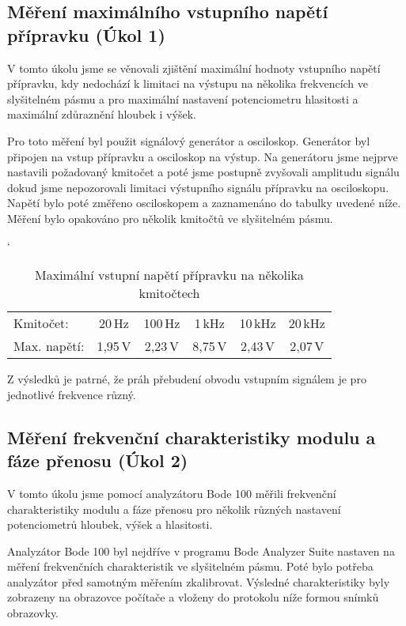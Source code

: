 \documentclass[a4paper, czech]{article}
\begin{document}
\subsection{Měření maximálního vstupního napětí přípravku (Úkol 1)}

V tomto úkolu jsme se věnovali zjištění maximální hodnoty vstupního napětí přípravku,
kdy nedochází k limitaci na výstupu na několika frekvencích ve slyšitelném pásmu
a pro maximální nastavení potenciometru hlasitosti a maximální zdůraznění hloubek i výšek.

Pro toto měření byl použit signálový generátor a osciloskop.
Generátor byl připojen na vstup přípravku a osciloskop na výstup.
Na generátoru jsme nejprve nastavili požadovaný kmitočet a poté jsme postupně zvyšovali
amplitudu signálu dokud jsme nepozorovali limitaci výstupního signálu přípravku na osciloskopu.
Napětí bylo poté změřeno osciloskopem a zaznamenáno do tabulky uvedené níže.
Měření bylo opakováno pro několik kmitočtů ve slyšitelném pásmu.

\begin{table}[H]
    \catcode`
    \centering
    \caption{Maximální vstupní napětí přípravku na několika kmitočtech}
    \begin{tabular}{lccccc}
        \toprule
        Kmitočet:    & 20\,Hz  & 100\,Hz & 1\,kHz  & 10\,kHz & 20\,kHz \\
        \cmidrule(rl){1-6}
        Max. napětí: & 1,95\,V & 2,23\,V & 8,75\,V & 2,43\,V & 2,07\,V \\
        \bottomrule
    \end{tabular}
\end{table}

Z výsledků je patrné, že práh přebudení obvodu vstupním signálem je pro jednotlivé frekvence různý.

\subsection{Měření frekvenční charakteristiky modulu a fáze přenosu (Úkol 2)}

V tomto úkolu jsme pomocí analyzátoru Bode 100 měřili frekvenční charakteristiky
modulu a fáze přenosu pro několik různých nastavení potenciometrů hloubek, výšek a hlasitosti.

Analyzátor Bode 100 byl nejdříve v programu Bode Analyzer Suite nastaven na měření
frekvenčních charakteristik ve slyšitelném pásmu.
Poté bylo potřeba analyzátor před samotným měřením zkalibrovat.
Výsledné charakteristiky byly zobrazeny na obrazovce počítače a vloženy do protokolu
níže formou snímků obrazovky.
\end{document}
